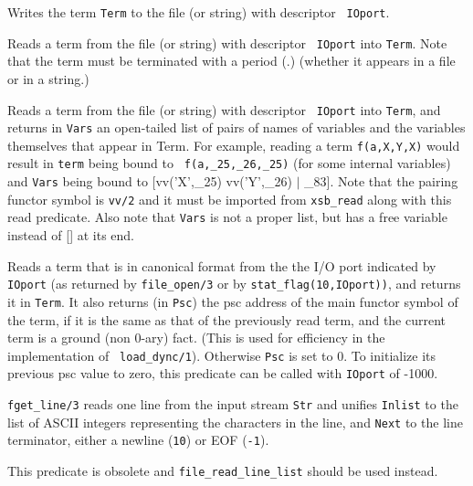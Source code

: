 {\begin{description}
    Writes the term {\tt Term} to the file (or string) with descriptor {\tt
    IOport}.

    Reads a term from the file (or string) with descriptor {\tt
    IOport} into {\tt Term}.  Note that the term must be terminated
    with a period (.) (whether it appears in a file or in a string.)

    Reads a term from the file (or string) with descriptor {\tt
    IOport} into {\tt Term}, and returns in {\tt Vars} an open-tailed list of
    pairs of names of variables and the variables themselves that
    appear in Term.  For example, reading a term {\tt f(a,X,Y,X)}
    would result in {\tt term} being bound to {\tt
    f(a,\_25,\_26,\_25)} (for some internal variables) and {\tt Vars}
    being bound to {[vv('X',\_25) vv('Y',\_26) $\mid$ \_83]}.  Note that the
    pairing functor symbol is {\tt vv/2} and it must be imported from
    {\tt xsb\_read} along with this read predicate.  Also note that 
    {\tt Vars} is not a proper list, but has a free variable instead 
    of [] at its end.

    Reads a term that is in canonical format from the the I/O port
    indicated by {\tt IOport} (as returned by {\tt file\_open/3} or
    by {\tt stat\_flag(10,IOport))}, and returns it in {\tt Term}.
    It also returns (in {\tt Psc}) the psc address of the main functor
    symbol of the term, if it is the same as that of the previously
    read term, and the current term is a ground (non 0-ary) fact.
    (This is used for efficiency in the implementation of {\tt
    load\_dync/1}).  Otherwise {\tt Psc} is set to 0.  To initialize
    its previous psc value to zero, this predicate can be called with
    {\tt IOport} of -1000.

    {\tt fget\_line/3} reads one line from the input stream {\tt Str} and
    unifies {\tt Inlist} to the list of ASCII integers representing the
    characters in the line, and {\tt Next} to the line terminator, either
    a newline ({\tt 10}) or EOF ({\tt-1}).
    
    This predicate is obsolete and
    \verb|file_read_line_list| should be used instead.

\end{description}

}

